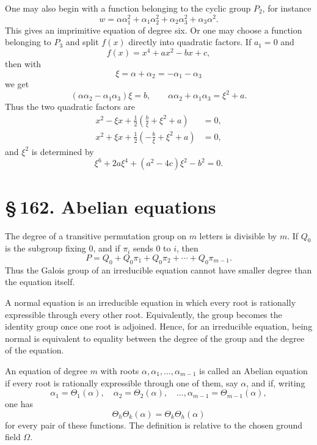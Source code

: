 \documentclass[11pt]{article}
\providecommand{\sect}[2]{\section*{\S\,#1. #2}}
\begin{document}
One may also begin with a function belonging to the cyclic group $P_2$, for instance
\[
        w=\alpha\alpha_1^2+\alpha_1\alpha_2^2+
          \alpha_2\alpha_3^2+\alpha_3\alpha^2.                         \tag{21}
\]
This gives an imprimitive equation of degree six. Or one may choose a function belonging to $P_3$ and split $f(x)$ directly into quadratic factors. If $a_1=0$ and
\[
        f(x)=x^4+ax^2-bx+c,                                           \tag{23}
\]
then with
\[
        \xi=\alpha+\alpha_2=-\alpha_1-\alpha_3                         \tag{22}
\]
we get
\[
        (\alpha\alpha_2-\alpha_1\alpha_3)\xi=b,
        \qquad
        \alpha\alpha_2+\alpha_1\alpha_3=\xi^2+a.
\]
Thus the two quadratic factors are
\[
\begin{aligned}
        x^2-\xi x+\frac12\left(\frac b\xi+\xi^2+a\right)&=0,\\
        x^2+\xi x+\frac12\left(-\frac b\xi+\xi^2+a\right)&=0,
\end{aligned}                                                          \tag{25}
\]
and $\xi^2$ is determined by
\[
        \xi^6+2a\xi^4+(a^2-4c)\xi^2-b^2=0.                             \tag{26}
\]

\sect{162}{Abelian equations}

The degree of a transitive permutation group on $m$ letters is divisible by $m$. If $Q_0$ is the subgroup fixing $0$, and if $\pi_i$ sends $0$ to $i$, then
\[
        P=Q_0+Q_0\pi_1+Q_0\pi_2+
        \cdots+Q_0\pi_{m-1}.                                           \tag{1}
\]
Thus the Galois group of an irreducible equation cannot have smaller degree than the equation itself.

A normal equation is an irreducible equation in which every root is rationally expressible through every other root. Equivalently, the group becomes the identity group once one root is adjoined. Hence, for an irreducible equation, being normal is equivalent to equality between the degree of the group and the degree of the equation.

An equation of degree $m$ with roots $\alpha,
\alpha_1,
\ldots,
\alpha_{m-1}$ is called an Abelian equation if every root is rationally expressible through one of them, say $\alpha$, and if, writing
\[
        \alpha_1=\Theta_1(\alpha),\quad
        \alpha_2=\Theta_2(\alpha),\quad \ldots,
        \alpha_{m-1}=\Theta_{m-1}(\alpha),                              \tag{2}
\]
one has
\[
        \Theta_h\Theta_k(\alpha)=\Theta_k\Theta_h(\alpha)                \tag{3}
\]
for every pair of these functions. The definition is relative to the chosen ground field $\Omega$.
\end{document}
